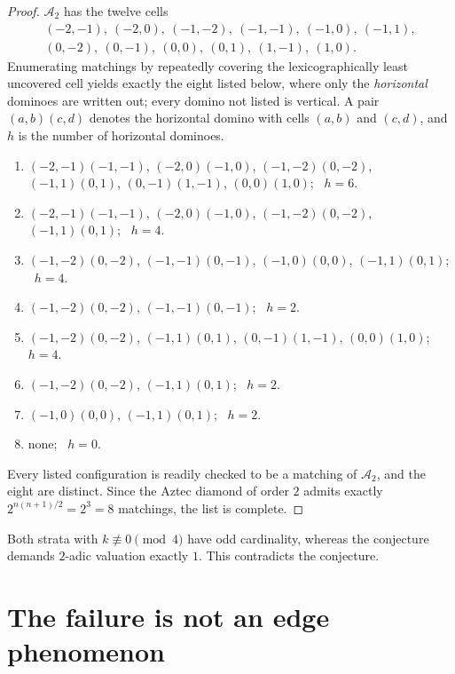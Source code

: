 \documentclass[11pt]{article}
\begin{document}
\begin{proof}
$\mathcal{A}_2$ has the twelve cells
\[
\begin{array}{l}
  (-2,-1),\ (-2,0),\ (-1,-2),\ (-1,-1),\ (-1,0),\ (-1,1),\\
  (0,-2),\ (0,-1),\ (0,0),\ (0,1),\ (1,-1),\ (1,0).
\end{array}
\]
Enumerating matchings by repeatedly covering the lexicographically least
uncovered cell yields exactly the eight listed below, where only the
\emph{horizontal} dominoes are written out; every domino not listed is
vertical.  A pair $(a,b)(c,d)$ denotes the horizontal domino with cells
$(a,b)$ and $(c,d)$, and $h$ is the number of horizontal dominoes.

\begin{enumerate}\setlength{\itemsep}{1pt}\setlength{\parsep}{1pt}
\item[$0$] $(-2,-1)(-1,-1)$, $(-2,0)(-1,0)$, $(-1,-2)(0,-2)$,
      $(-1,1)(0,1)$, $(0,-1)(1,-1)$, $(0,0)(1,0)$; \ $h=6$.
\item[$1$] $(-2,-1)(-1,-1)$, $(-2,0)(-1,0)$, $(-1,-2)(0,-2)$,
      $(-1,1)(0,1)$; \ $h=4$.
\item[$2$] $(-1,-2)(0,-2)$, $(-1,-1)(0,-1)$, $(-1,0)(0,0)$,
      $(-1,1)(0,1)$; \ $h=4$.
\item[$3$] $(-1,-2)(0,-2)$, $(-1,-1)(0,-1)$; \ $h=2$.
\item[$4$] $(-1,-2)(0,-2)$, $(-1,1)(0,1)$, $(0,-1)(1,-1)$,
      $(0,0)(1,0)$; \ $h=4$.
\item[$5$] $(-1,-2)(0,-2)$, $(-1,1)(0,1)$; \ $h=2$.
\item[$6$] $(-1,0)(0,0)$, $(-1,1)(0,1)$; \ $h=2$.
\item[$7$] none; \ $h=0$.
\end{enumerate}

Every listed configuration is readily checked to be a matching of
$\mathcal{A}_2$, and the eight are distinct.  Since the Aztec diamond of
order $2$ admits exactly $2^{n(n+1)/2} = 2^{3} = 8$ matchings, the list is
complete.
\end{proof}

Both strata with $k \not\equiv 0 \pmod 4$ have odd cardinality, whereas the
conjecture demands $2$-adic valuation exactly $1$.  This contradicts the
conjecture.

\section*{The failure is not an edge phenomenon}
\end{document}
